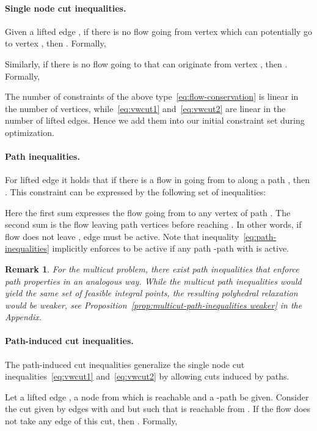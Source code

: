 \documentclass{article}
\newtheorem{remark}{Remark}
\begin{document}
\paragraph{Single node cut inequalities.}
Given a lifted edge , if there is no flow going from vertex  which can potentially go to vertex , then . 
Formally,

Similarly, if there is no flow going to  that can originate from vertex , then .
Formally,


The number of constraints of the above type~\eqref{eq:flow-conservation} is linear in the number of vertices, while~\eqref{eq:vwcut1} and~\eqref{eq:vwcut2} are linear in the number of lifted edges.
Hence we add them into our initial constraint set during optimization.

\paragraph{Path inequalities.}
For lifted edge  it holds that if there is
a flow in  going from  to  along a path ,
then . This constraint can be expressed by the following set of inequalities:

Here the first sum expresses the flow going from  to any vertex of path . The second sum is the flow leaving path vertices  before reaching .
In other words, if flow does not leave , edge  must be active.
Note that inequality~\eqref{eq:path-inequalities} implicitly enforces  to be active if any path -path  with  is active.




\begin{remark}
For the multicut problem, there exist path inequalities that enforce path properties in an analogous way.
While the multicut path inequalities would yield the same set of feasible integral points, the resulting polyhedral relaxation would be weaker, see Proposition~\ref{prop:multicut-path-inequalities weaker} in the Appendix.
\end{remark}

\paragraph{Path-induced cut inequalities.}
The path-induced cut inequalities generalize the single node cut inequalities~\eqref{eq:vwcut1} and~\eqref{eq:vwcut2} by allowing cuts induced by paths.

Let a lifted edge , a node  from which  is reachable and a -path  be given.
Consider the cut given by edges  with  and  but such that  is reachable from .
If the flow does not take any edge of this cut, then .
Formally,
\end{document}
